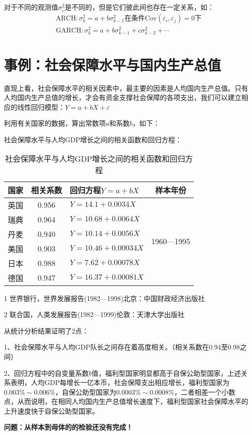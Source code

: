 对于不同的观测值$ \sigma_{i}^{2} $是不同的，但是它们彼此间也存在一定关系，如：
\begin{align*}
	&\text{ARCH}: \sigma_{k}^{2}=a+b \sigma_{k-1}^{2}\text{在条件} \mathrm{Cov}\left(\varepsilon_{i}, \varepsilon_{j}\right)
	=0\text{下} \\	
	&\text{GARCH}: \sigma_{k}^{2}=a+b \sigma_{k-1}^{2}+c \sigma_{k-2}^{2}+\cdots 
\end{align*}

\section{事例：社会保障水平与国内生产总值}

直现上看，社会保障水平的相关因素中，最主要的因素是人均国内生产总值。只有人均国内生产总值的增长，才会有资金支撑社会保障的各项支出，我们可以建立相应的线性回归模型：$ Y=a+bX+\varepsilon $
	
利用有关国家的数据，算出常数项$ a $和系数$ b $，如下：
	
社会保障水平与人均GDP增长之间的相关函数和回归方程：
\begin{table}[htb!]
	\centering
	\setlength{\tabcolsep}{2em}
	\begin{threeparttable}[b]
		\caption{社会保障水平与人均GDP增长之间的相关函数和回归方程} 
		\begin{tabular}{cclc}
			\hline
			国家 & 相关系数 & 回归方程$Y=a+bX$      & 样本年份             \\
			\hline
			英国 & 0.956 & $Y=14.1+0.0034X$   & \multirow{6}{*}{1960—1995} \\
			瑞典 & 0.964 & $Y=10.68+0.0064X$  &                            \\
			丹麦 & 0.940 & $Y=10.14+0.0056X$  &                            \\
			美国 & 0.903 & $Y=10.46+0.00034X$ &                            \\
			日本 & 0.988 & $Y=7.62+0.00078X$  &                            \\
			德国 & 0.947 & $Y=16.37+0.00081X$ &                            \\
			\hline
		\end{tabular}
		\begin{tablenotes} \tiny
			\item[1] 世界银行，世界发展报告(1982—1998)北京：中国财政经济出版社
			\item[2] 联合国，人类发展报告(1982—1999)伦敦：天津大学出版社
		\end{tablenotes}
	\end{threeparttable}
\end{table}
	
	
	
从统计分析结果证明了2点：
	
1、社会保障水平与人均GDP队长之间存在着高度相关。（相关系数在0.94至0.98之间）
	
2、回归方程中的自变量系数$ b $值，福利型国家明显都高于自保公助型国家，上述关系表明，人均GDP每增长一亿本币，社会保障支出相应增长，福利型国家为$ 0.003\% \sim 0.006\% $，自保公助型国家为$ 0.0003\% \sim 0.0008\% $，二者相差一个小数点，从而说明，在相同人均国内生产总值增长速度下，福利型国家社会保障水平的上升速度快于自保公助型国家。
		
\textbf{问题：从样本到母体的的检验还没有完成！}